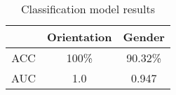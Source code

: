 \begin{table}
    \centering
    \begin{tabular}{ccc}
        \toprule
        & Orientation & Gender \\
        \midrule
        ACC & 100\% & 90.32\%  \\
        AUC & 1.0 & 0.947  \\
        \bottomrule
    \end{tabular}
    \caption{Classification model results}
    \label{tab:classification-model-results}
\end{table}